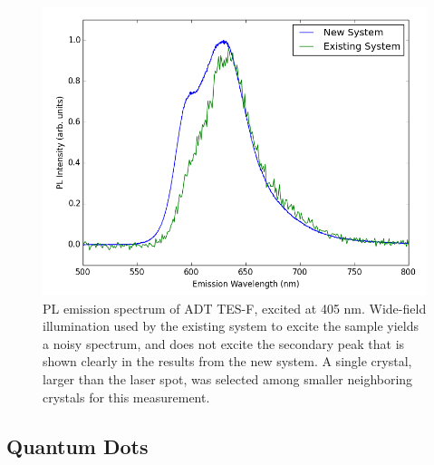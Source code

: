 \begin{figure}[h]
    \centering
    \includegraphics[width=.8\textwidth]{./img/tesf-2.png}%
    \caption[PL emission spectrum of ADT TES-F, excited at 405nm.]{PL emission spectrum of ADT TES-F, excited at 405 nm.
    Wide-field illumination used by the existing system to excite the sample
    yields a noisy spectrum, and does not excite the secondary peak that is 
    shown clearly in the results from the new system. A single crystal, larger than the laser spot, was selected among smaller neighboring crystals for this measurement. %
    }
    \label{fig:pl-adt-tesf}
\end{figure}

\subsection{ Quantum Dots}

